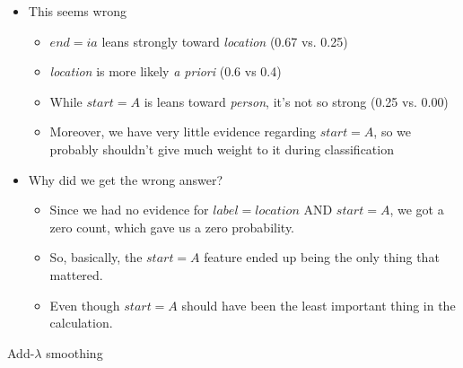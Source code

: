 \documentclass[11pt,letterpaper]{article}
\begin{document}
\begin{itemize}
  \item This seems wrong
    \begin{itemize}
      \item $end=ia$ leans strongly toward \textit{location} (0.67 vs. 0.25)
      \item \textit{location} is more likely \textit{a priori} (0.6 vs 0.4)
      \item While $start=A$ is leans toward \textit{person}, it's not so strong (0.25 vs. 0.00)
      \item Moreover, we have very little evidence regarding $start=A$, so we probably shouldn't give much weight to it during classification
    \end{itemize}
  \item Why did we get the wrong answer?
    \begin{itemize}
      \item Since we had no evidence for $label=location$ AND $start=A$, we got a zero count, which gave us a zero probability.
      \item So, basically, the $start=A$ feature ended up being the only thing that mattered.
      \item Even though $start=A$ should have been the least important thing in the calculation.
    \end{itemize}
\end{itemize}

Add-$\lambda$ smoothing
\end{document}

